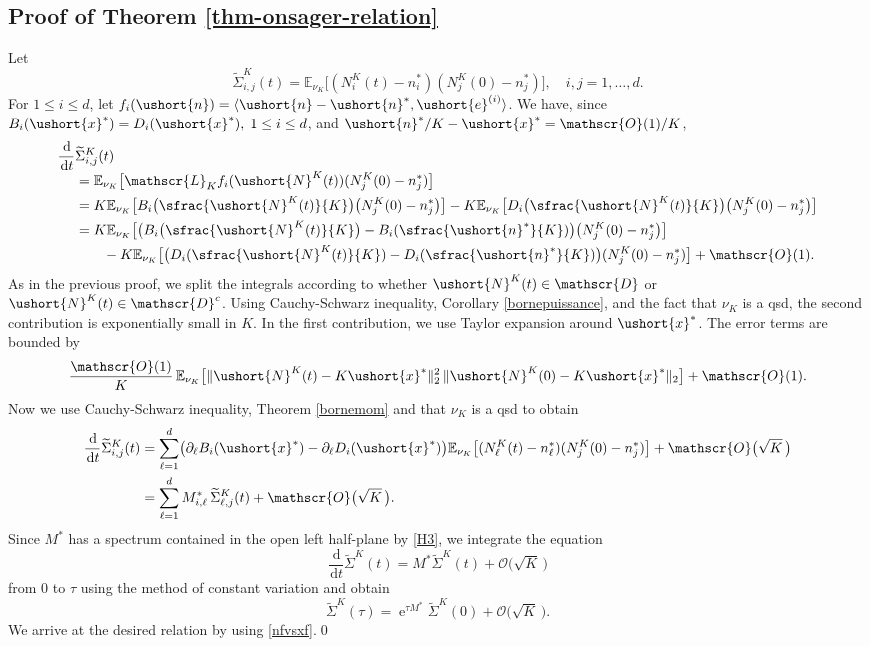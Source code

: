 \documentclass[10pt]{amsart}
\newcommand{\scaleto}[2]{#1}
\let\mathcal\mathscr
\numberwithin{equation}{section}
\theoremstyle{plain}
\theoremstyle{definition}
\newcommand{\E}{{\mathbb{E}}}
\newcommand{\Oun}{\mathcal{O}(1)}
\newcommand{\sK}{K}
\newcommand{\gen}{\mathscr{L}_{\sK}}
\newcommand{\vecn}{\ushort{n}}
\newcommand{\vecnf}{\ushort{n}^*}
\newcommand{\vecxf}{\ushort{x}^*}
\newcommand{\vece}[1]{\ushort{e}^{(#1)}}
\newcommand{\leproc}{\ushort{N}^{K}}
\newcommand{\nuk}{\nu_{K}}\let\snuk\nuk
\newcommand{\e}{\operatorname{e}}
\newcommand{\dd}{\hspace{1pt}\mathrm{d}}
\begin{document}
\subsection{Proof of Theorem \ref{thm-onsager-relation}}\label{proof:onsager}

Let
\[
\widetilde{\Sigma}_{i,j}^{\sK}(t)=\E_{\snuk}\bigl[(N_{i}^{\sK}(t)-n_{i}^{\scaleto{*}{2.5pt}})(N_{j}^{\sK}(0)-n_{j}^*)\bigr],\quad i,j=1,\ldots,d.
\]
For $1\leq i\leq d$, let $f_i(\vecn)=\langle \vecn-\vecnf,\vece{i}\rangle$.
We have, since $B_{i}(\vecxf)=D_{i}(\vecxf),\; 1\le i\le d$, and $\vecnf/K-\vecxf=\Oun/K$,\vspace*{-3pt}
\begin{align*}
\frac{\dd}{\dd t}&\widetilde{\Sigma}_{i,j}^{\sK}(t)\\[-3pt]
& =\E_{\snuk}\bigl[\gen f_i(\leproc(t)) (N_{j}^{\sK}(0)-n_{j}^{\scaleto{*}{2.5pt}})\bigr]\\
& =K\E_{\snuk}\bigl[B_{i}\bigl(\sfrac{\leproc(t)}{K}\bigr)\bigl(N_{j}^{\sK}(0)-n_{j}^{\scaleto{*}{2.5pt}}\bigr)\bigr]-K\E_{\snuk}\bigl[D_{i}\bigl(\sfrac{\leproc(t)}{K}\bigr)\bigl(N_{j}^{\sK}
(0)-n_{j}^{\scaleto{*}{2.5pt}}\bigr) \bigr]\\
&=K\E_{\snuk}\bigl[\bigl(B_{i} \bigl(\sfrac{\leproc(t)}{K} \bigr)-B_{i}(\sfrac{\vecnf}{K}) \bigr)
\bigl(N_{j}^{\sK}(0)-n_{j}^{\scaleto{*}{2.5pt}}\bigr) \bigr]\\
& \qquad -K\E_{\snuk}\bigl[\bigl(D_{i}(\sfrac{\leproc(t)}{K})
-D_{i}(\sfrac{\vecnf}{K}) \bigr)(N_{j}^{\sK}(0)-n_{j}^{\scaleto{*}{2.5pt}}) \bigr] + \Oun.
\end{align*}
As in the previous proof, we split the integrals according to whether $\leproc(t)\in \mathcal{D}$ or
$\leproc(t)\in \mathcal{D}^c$. Using Cauchy-Schwarz inequality, Corollary \ref{bornepuissance}, and the fact that $\nuk$ is a qsd, the second contribution is exponentially small in $K$. In the first contribution, we use Taylor expansion around $\vecxf$.
The error terms are bounded by
\[
\frac{\Oun}{K}\, \E_{\snuk}\bigl[\|\leproc(t)-K\vecxf\|_{2}^2\,\|\leproc(0)-K\vecxf\|_{2}\bigr]
+\Oun.
\]
Now we use Cauchy-Schwarz inequality, Theorem \ref{bornemom} and that $\nuk$ is a qsd to obtain
\begin{align*}
\frac{\dd}{\dd t}\widetilde{\Sigma}_{i,j}^{\sK}(t)&=\sum_{\ell=1}^{d}\bigl(\partial_{\ell}B_{i}(\vecxf)-\partial_{\ell}D_{i}(\vecxf)\bigr)
\E_{\snuk}\bigl[(N_{\ell}^{\sK}(t)-n_{\ell}^{\scaleto{*}{2.5pt}}) (N_{j}^{\sK}(0)-n_{j}^{\scaleto{*}{2.5pt}})\bigr]+
\mathcal{O} \bigl(\sqrt K\, \bigr)\\
& =\sum_{\ell=1}^{d}M_{i,\ell}^{*}\, \widetilde{\Sigma}^{\sK}_{\ell,j}(t)+\mathcal{O}\bigl(\sqrt K\,\bigr).
\end{align*}
Since $M^*$ has a spectrum contained in the open left half-plane by \eqref{H3}, we integrate the equation
\[
\frac{\dd}{\dd t}\widetilde{\Sigma}^{\sK}(t)= M^*\widetilde{\Sigma}^{\sK}(t)+\mathcal{O}\bigl(\sqrt K\,\bigr)
\]
from $0$ to $\tau$ using the method of constant variation and obtain
\begin{equation*}
\widetilde{\Sigma}^{\sK}(\tau)=\e^{\tau M^*}\widetilde{\Sigma}^{\sK}(0)+\mathcal{O}\bigl(\sqrt K\,\bigr).
\end{equation*}
We arrive at the desired relation by using \eqref{nfvsxf}.\qed
\end{document}
